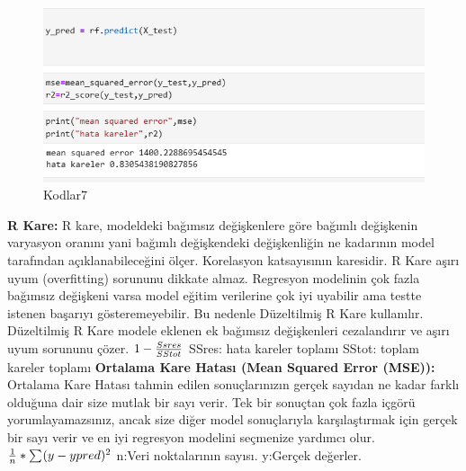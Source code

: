 \documentclass[12pt, a4paper]{article}
\begin{document}
	\begin{figure}[!htbp] 
		\caption{Kodlar7}
		\centering
		\includegraphics[angle=0, width=\textwidth]{11.0.png} 
		
	\end{figure}
	\textbf{R Kare:} R kare, modeldeki bağımsız değişkenlere göre bağımlı değişkenin varyasyon oranını yani bağımlı değişkendeki değişkenliğin ne kadarının model tarafından açıklanabileceğini ölçer. Korelasyon katsayısının karesidir. R Kare aşırı uyum (overfitting) sorununu dikkate almaz. Regresyon modelinin çok fazla bağımsız değişkeni varsa model eğitim verilerine çok iyi uyabilir ama testte istenen başarıyı gösteremeyebilir. Bu nedenle Düzeltilmiş R Kare kullanılır. Düzeltilmiş R Kare modele eklenen ek bağımsız değişkenleri cezalandırır ve aşırı uyum sorununu çözer.\newline
	\begin{math} 
		\centering	\newline 1-\frac{Ssres}{SStot} 
	\end{math}\newline
	SSres: hata kareler toplamı\newline
	SStot: toplam kareler toplamı\newline
	\textbf{Ortalama Kare Hatası (Mean Squared Error (MSE)):} Ortalama Kare Hatası tahmin edilen sonuçlarınızın gerçek sayıdan ne kadar farklı olduğuna dair size mutlak bir sayı verir. Tek bir sonuçtan çok fazla içgörü yorumlayamazsınız, ancak size diğer model sonuçlarıyla karşılaştırmak için gerçek bir sayı verir ve en iyi regresyon modelini seçmenize yardımcı olur. \cite{site11}
	\begin{math} 
		\centering	\newline \frac{1}{n} * \sum_{}^{}(y-ypred)^2
	\end{math}	
	\newline n:Veri noktalarının sayısı.
	\newline y:Gerçek değerler.
\end{document}
